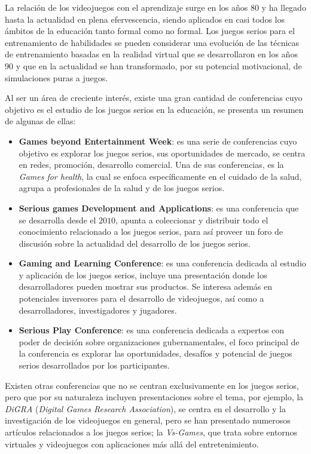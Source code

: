 La relación de los videojuegos con el aprendizaje surge en los años $80$ y ha llegado
hasta la actualidad en plena efervescencia, siendo aplicados en casi todos los
ámbitos de la educación tanto formal como no formal. Los juegos serios para el
entrenamiento de habilidades se pueden considerar una evolución de las técnicas
de entrenamiento basadas en la realidad virtual que se desarrollaron en los años
$90$ y que en la actualidad se han transformado, por su potencial motivacional,
de simulaciones puras a juegos\cite{videojuegos:gonzaleztardon}.

Al ser un área de creciente interés, existe una gran cantidad de conferencias
cuyo objetivo es el estudio de los juegos serios en la educación, se presenta un
resumen de algunas de ellas:

\begin{itemize}
\item \textbf{Games beyond Entertainment Week}: es una serie de conferencias
    cuyo objetivo es explorar los juegos serios, sus oportunidades de mercado,
    se centra en redes, promoción, desarrollo comercial. Una de sus
    conferencias, es la \emph{Games for health}, la cual se enfoca
    específicamente en el cuidado de la salud, agrupa a profesionales de la
    salud y de los juegos serios\cite{games_beyond_entertainment}.
\item \textbf{Serious games Development and Applications}: es una conferencia
    que se desarrolla desde el $2010$, apunta a coleccionar y distribuir todo el
    conocimiento relacionado a los juegos serios, para así proveer un foro de
    discusión sobre la actualidad del desarrollo de los juegos
    serios\cite{sgda}.
\item \textbf{Gaming and Learning Conference}: es una conferencia dedicada al
    estudio y aplicación de los juegos serios, incluye una presentación donde
    los desarrolladores pueden mostrar sus productos. Se interesa además en
    potenciales inversores para el desarrollo de videojuegos, así como a
    desarrolladores, investigadores y jugadores\cite{gala}.
\item \textbf{Serious Play Conference}: es una conferencia dedicada a expertos
    con poder de decisión sobre organizaciones gubernamentales, el foco
    principal de la conferencia es explorar las oportunidades, desafíos y
    potencial de juegos serios desarrollados por los
    participantes\cite{seriousplay}.
\end{itemize}

Existen otras conferencias que no se centran exclusivamente en los juegos
serios, pero que por su naturaleza incluyen presentaciones sobre el tema, por
ejemplo, la \emph{DiGRA} (\textit{Digital Games Research Association}), se
centra en el desarrollo y la investigación de los videojuegos en general, pero
se han presentado numerosos artículos relacionados a  los juegos serios; la
\emph{Vs-Games}, que trata sobre entornos virtuales y videojuegos con  aplicaciones
más allá del entretenimiento.

